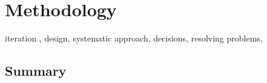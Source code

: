 \chapter{Methodology}
\label{ch:methodology}

iteration , design, systematic approach, decisions, resolving problems, 

\section{Summary}
